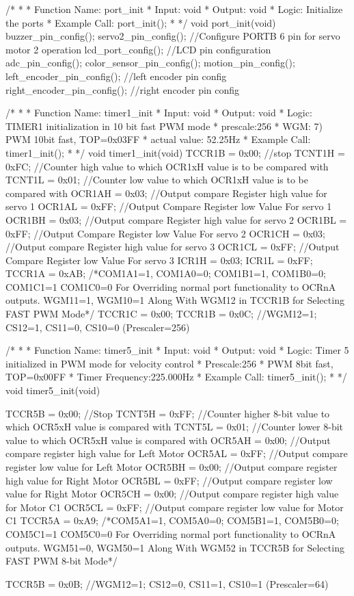 /*
*
* Function Name: port_init
* Input: void
* Output: void
* Logic: Initialize the ports
* Example Call: port_init();
*
*/
void port_init(void)
{   
	buzzer_pin_config();
	servo2_pin_config();        //Configure PORTB 6 pin for servo motor 2 operation
	lcd_port_config();          //LCD pin configuration
	adc_pin_config();
	color_sensor_pin_config();
	motion_pin_config();
	left_encoder_pin_config(); //left encoder pin config
	right_encoder_pin_config(); //right encoder pin config
}

/*
*
* Function Name: timer1_init
* Input: void
* Output: void
* Logic: TIMER1 initialization in 10 bit fast PWM mode
*        prescale:256
*        WGM: 7) PWM 10bit fast, TOP=0x03FF
*        actual value: 52.25Hz
* Example Call: timer1_init();
*
*/
void timer1_init(void)
{
 TCCR1B = 0x00; //stop
 TCNT1H = 0xFC; //Counter high value to which OCR1xH value is to be compared with
 TCNT1L = 0x01;	//Counter low value to which OCR1xH value is to be compared with
 OCR1AH = 0x03;	//Output compare Register high value for servo 1
 OCR1AL = 0xFF;	//Output Compare Register low Value For servo 1
 OCR1BH = 0x03;	//Output compare Register high value for servo 2
 OCR1BL = 0xFF;	//Output Compare Register low Value For servo 2
 OCR1CH = 0x03;	//Output compare Register high value for servo 3
 OCR1CL = 0xFF;	//Output Compare Register low Value For servo 3
 ICR1H  = 0x03;	
 ICR1L  = 0xFF;
 TCCR1A = 0xAB; /*{COM1A1=1, COM1A0=0; COM1B1=1, COM1B0=0; COM1C1=1 COM1C0=0}
 					For Overriding normal port functionality to OCRnA outputs.
				  {WGM11=1, WGM10=1} Along With WGM12 in TCCR1B for Selecting FAST PWM Mode*/
 TCCR1C = 0x00;
 TCCR1B = 0x0C; //WGM12=1; CS12=1, CS11=0, CS10=0 (Prescaler=256)
}

/*
*
* Function Name: timer5_init
* Input: void
* Output: void
* Logic: Timer 5 initialized in PWM mode for velocity control
*        Prescale:256
*        PWM 8bit fast, TOP=0x00FF
*        Timer Frequency:225.000Hz
* Example Call: timer5_init();
*
*/
void timer5_init(void)
{
	TCCR5B = 0x00;	//Stop
	TCNT5H = 0xFF;	//Counter higher 8-bit value to which OCR5xH value is compared with
	TCNT5L = 0x01;	//Counter lower 8-bit value to which OCR5xH value is compared with
	OCR5AH = 0x00;	//Output compare register high value for Left Motor
	OCR5AL = 0xFF;	//Output compare register low value for Left Motor
	OCR5BH = 0x00;	//Output compare register high value for Right Motor
	OCR5BL = 0xFF;	//Output compare register low value for Right Motor
	OCR5CH = 0x00;	//Output compare register high value for Motor C1
	OCR5CL = 0xFF;	//Output compare register low value for Motor C1
	TCCR5A = 0xA9;	/*{COM5A1=1, COM5A0=0; COM5B1=1, COM5B0=0; COM5C1=1 COM5C0=0}
 					  For Overriding normal port functionality to OCRnA outputs.
				  	  {WGM51=0, WGM50=1} Along With WGM52 in TCCR5B for Selecting FAST PWM 8-bit Mode*/
	
	TCCR5B = 0x0B;	//WGM12=1; CS12=0, CS11=1, CS10=1 (Prescaler=64)
}

